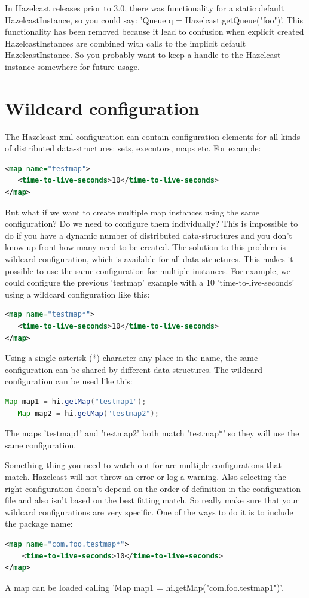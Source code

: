 In Hazelcast releases prior to 3.0, there was functionality for a static default HazelcastInstance, so you could say: 'Queue q = Hazelcast.getQueue("foo")'. This functionality has been removed because it lead to confusion when explicit created HazelcastInstances are combined with calls to the implicit default HazelcastInstance. So you probably want to keep a handle to the Hazelcast instance somewhere for future usage.

\section{Wildcard configuration}
The Hazelcast xml configuration can contain configuration elements for all kinds of distributed data-structures: sets, executors, maps etc. For example:
\begin{lstlisting}[language=xml]
<map name="testmap">
   <time-to-live-seconds>10</time-to-live-seconds>
</map>
\end{lstlisting}
But what if we want to create multiple map instances using the same configuration? Do we need to configure them individually? This is impossible to do if you have a dynamic number of distributed data-structures and you don't know up front how many need to be created. The solution to this problem is wildcard configuration, which is available for all data-structures. This makes it possible to use the same configuration for multiple instances. For example, we could configure the previous 'testmap' example with a 10 'time-to-live-seconds' using a wildcard configuration like this:
\begin{lstlisting}[language=xml]
<map name="testmap*">
   <time-to-live-seconds>10</time-to-live-seconds>
</map>
\end{lstlisting}
Using a single asterisk (*) character any place in the name, the same configuration can be shared by different  data-structures. The wildcard configuration can be used like this:
\begin{lstlisting}[language=java]
   Map map1 = hi.getMap("testmap1");
   Map map2 = hi.getMap("testmap2");
\end{lstlisting}
The maps 'testmap1' and 'testmap2' both match 'testmap*' so they will use the same configuration.

Something thing you need to watch out for are multiple configurations that match. Hazelcast will not throw an error or log a warning. Also selecting the right configuration doesn't depend on the order of definition in the configuration file and also isn't based on the best fitting match. So really make sure that your wildcard configurations are very specific. One of the ways to do it is to include the package name:
\begin{lstlisting}[language=xml]
<map name="com.foo.testmap*">
    <time-to-live-seconds>10</time-to-live-seconds>
</map>
\end{lstlisting}
A map can be loaded calling 'Map map1 = hi.getMap("com.foo.testmap1")'. 

